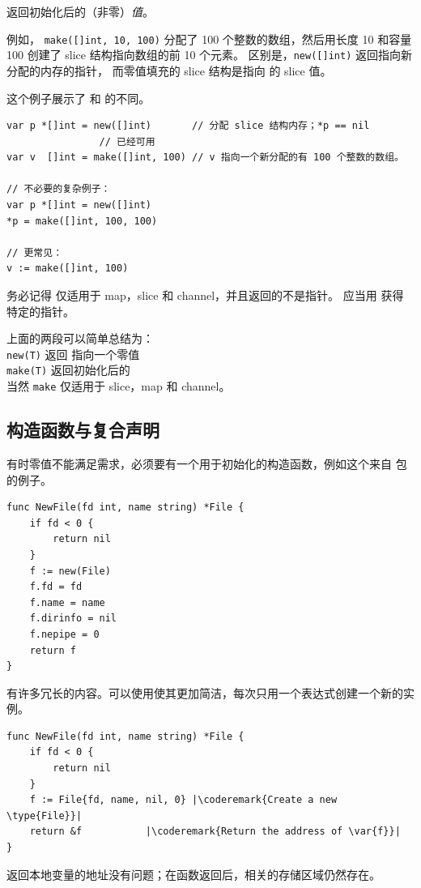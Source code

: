 \begin{lbar}[]
 返回初始化后的（非零）\emph{值}。
\end{lbar}

例如，
\lstinline{make([]int, 10, 100)}
分配了 100 个整数的数组，然后用长度 10 和容量 100 创建了 slice 
结构指向数组的前 10 个元素。
区别是，\lstinline{new([]int)} 返回指向新分配的内存的指针，
而零值填充的 slice 结构是指向  的 slice 值。

这个例子展示了  和  的不同。
\begin{lstlisting}
var p *[]int = new([]int)       // 分配 slice 结构内存；*p == nil
				// 已经可用
var v  []int = make([]int, 100) // v 指向一个新分配的有 100 个整数的数组。

// 不必要的复杂例子：
var p *[]int = new([]int)
*p = make([]int, 100, 100)

// 更常见：
v := make([]int, 100)
\end{lstlisting}
务必记得  仅适用于 map，slice 和 channel，并且返回的不是指针。
应当用  获得特定的指针。

\begin{lbar}
上面的两段可以简单总结为：\\

\lstinline{new(T)} 返回  指向一个零值 \\
\lstinline{make(T)} 返回初始化后的 \\
当然 \lstinline{make} 仅适用于 slice，map 和 channel。\\
\end{lbar}

\subsection{构造函数与复合声明}
\label{sec:constructors and composite literals}
有时零值不能满足需求，必须要有一个用于初始化的构造函数，例如这个来自
 包的例子。
\begin{lstlisting}
func NewFile(fd int, name string) *File {
    if fd < 0 {
        return nil
    }
    f := new(File)
    f.fd = fd
    f.name = name
    f.dirinfo = nil
    f.nepipe = 0
    return f
}
\end{lstlisting}
有许多冗长的内容。可以使用使其更加简洁，每次只用一个表达式创建一个新的实例。

\begin{lstlisting}
func NewFile(fd int, name string) *File {
    if fd < 0 {
        return nil
    }
    f := File{fd, name, nil, 0}	|\coderemark{Create a new \type{File}}|
    return &f			|\coderemark{Return the address of \var{f}}|
}
\end{lstlisting}
返回本地变量的地址没有问题；在函数返回后，相关的存储区域仍然存在。

